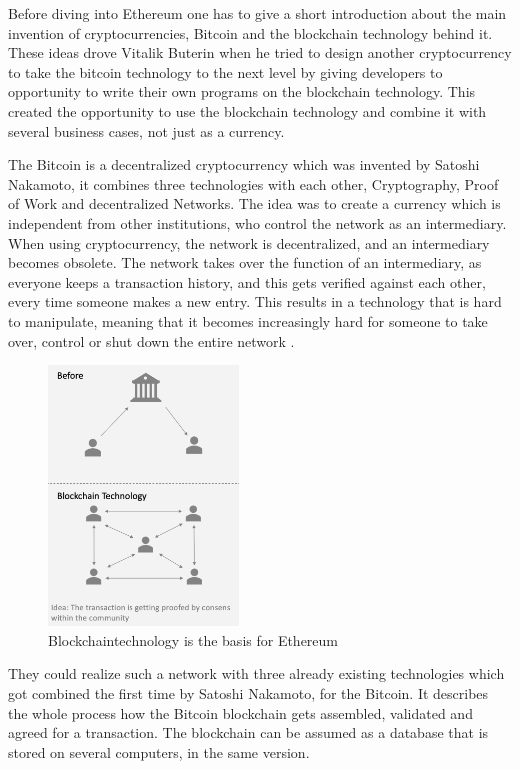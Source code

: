 Before diving into Ethereum one has to give a short introduction about the main invention of cryptocurrencies, Bitcoin and the blockchain technology behind it. 
These ideas drove Vitalik Buterin when he tried to design another cryptocurrency to take the bitcoin technology to the next level by giving developers to opportunity to write their own programs on the blockchain technology. 
This created the opportunity to use the blockchain technology and combine it with several business cases, not just as a currency. 

The Bitcoin is a decentralized cryptocurrency which was invented by Satoshi Nakamoto, it combines three technologies with each other, Cryptography, Proof of Work and decentralized Networks. The idea was to create a currency which is independent from other institutions, who control the network as an intermediary. When using cryptocurrency, the network is decentralized, and an intermediary becomes obsolete. 
The network takes over the function of an intermediary, as everyone keeps a transaction history, and this gets verified against each other, every time someone makes a new entry.
This results in a technology that is hard to manipulate, meaning that it becomes increasingly hard for someone to take over, control or shut down the entire network \cite{grishchenko2018semantic}.

\begin{figure}[ht]
\centering
\caption{Blockchaintechnology is the basis for Ethereum} 
\includegraphics[width=0.45\textwidth]{blockchaintech}
\end{figure}

They could realize such a network with three already existing technologies which got combined the first time by Satoshi Nakamoto, for the Bitcoin. 
It describes the whole process how the Bitcoin blockchain gets assembled, validated and agreed for a transaction. 
The blockchain can be assumed as a database that is stored on several computers, in the same version\cite{grishchenko2018semantic}.

